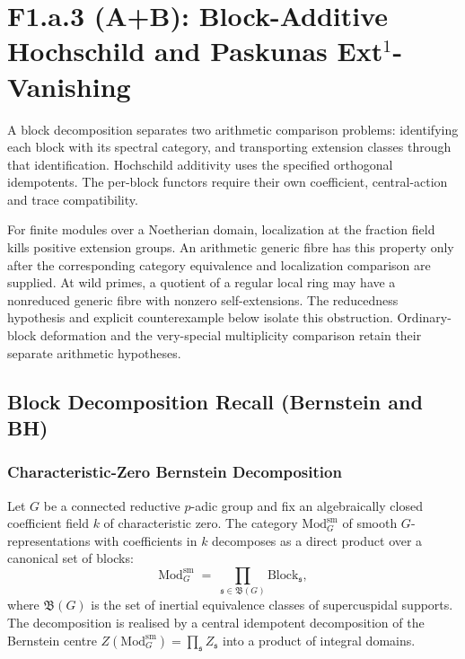 \chapter{F1.a.3 (A+B): Block-Additive Hochschild and Paskunas
Ext\({}^{1}\)-Vanishing}
\label{v4-arith:w5-f:F1a3-AB}

A block decomposition separates two arithmetic comparison problems:
identifying each block with its spectral category, and transporting
extension classes through that identification. Hochschild additivity
uses the specified orthogonal idempotents. The per-block functors
require their own coefficient, central-action and trace compatibility.

For finite modules over a Noetherian domain, localization at the
fraction field kills positive extension groups. An arithmetic generic
fibre has this property only after the corresponding category equivalence
and localization comparison are supplied. At wild primes, a quotient
of a regular local ring may have a nonreduced generic fibre with
nonzero self-extensions. The reducedness hypothesis and explicit
counterexample below isolate this obstruction. Ordinary-block deformation
and the very-special multiplicity comparison retain their separate
arithmetic hypotheses.

\section{Block Decomposition Recall (Bernstein and BH)}
\label{v4-arith:w5-f:F1a3-AB:block-recall}

\subsection{Characteristic-Zero Bernstein Decomposition}

\begin{theorem}
\label{v4-arith:w5-f:F1a3-AB:thm:bernstein}
\ClaimStatusProvedElsewhere Let \(G\) be a connected reductive
\(p\)-adic group and fix an algebraically closed coefficient
field \(k\) of characteristic zero. The category
\(\mathrm{Mod}^{\mathrm{sm}}_{G}\) of smooth \(G\)-representations with
coefficients in \(k\) decomposes as a direct product over a
canonical set of blocks:
\begin{equation}
\label{v4-arith:w5-f:F1a3-AB:eq:bernstein-decomposition}
\mathrm{Mod}^{\mathrm{sm}}_{G}\;=\;\prod_{\mathfrak{s}\in\mathfrak{B}(G)}
\mathrm{Block}_{\mathfrak{s}},
\end{equation}
where \(\mathfrak{B}(G)\) is the set of inertial equivalence classes
of supercuspidal supports. The decomposition is realised by a
central idempotent decomposition of the Bernstein centre
\(Z(\mathrm{Mod}^{\mathrm{sm}}_{G})=\prod_{\mathfrak{s}}Z_{\mathfrak{s}}\)
into a product of integral domains.
\end{theorem}


